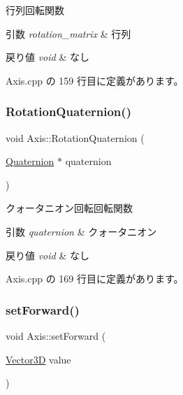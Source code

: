 行列回転関数 


\begin{DoxyParams}{引数}
{\em rotation\+\_\+matrix} & 行列 \\
\hline
\end{DoxyParams}

\begin{DoxyRetVals}{戻り値}
{\em void} & なし \\
\hline
\end{DoxyRetVals}


 Axis.\+cpp の 159 行目に定義があります。

\mbox{\label{class_axis_a0c12edd6d56e298b41b0a20ef2cacceb}} 
\subsubsection{\texorpdfstring{Rotation\+Quaternion()}{RotationQuaternion()}}
{\footnotesize\ttfamily void Axis\+::\+Rotation\+Quaternion (\begin{DoxyParamCaption}\item[{\mbox{\hyperlink{_vector3_d_8h_a3ee38c9c46d9851e33a9a1113328dafc}{Quaternion}} $\ast$}]{quaternion }\end{DoxyParamCaption})}



クォータニオン回転回転関数 


\begin{DoxyParams}{引数}
{\em quaternion} & クォータニオン \\
\hline
\end{DoxyParams}

\begin{DoxyRetVals}{戻り値}
{\em void} & なし \\
\hline
\end{DoxyRetVals}


 Axis.\+cpp の 169 行目に定義があります。

\mbox{\label{class_axis_af37757c4c30c1a9d0e111a2d954bf734}} 
\subsubsection{\texorpdfstring{set\+Forward()}{setForward()}}
{\footnotesize\ttfamily void Axis\+::set\+Forward (\begin{DoxyParamCaption}\item[{\mbox{\hyperlink{class_vector3_d}{Vector3D}}}]{value }\end{DoxyParamCaption})}



